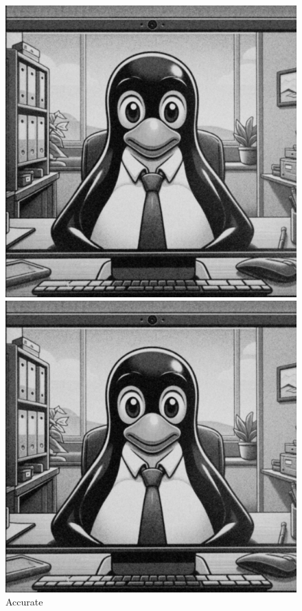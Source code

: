 \documentclass[course=erap]{aspdoc}
\begin{document}
\begin{figure}
    \centering
    \begin{minipage}[t]{.33\linewidth}
        \centering
        \includegraphics[width=\linewidth]{Image/Sample_VideoCall/denoisedvideocall_acurate.png}
        \caption{Accurate}
        \label{fig:accurate}
    \end{minipage}%
    \begin{minipage}[t]{.33\linewidth}
        \centering
        \includegraphics[width=\linewidth]{Image/Sample_VideoCall/denoisedvideocall_integer.png}

\end{minipage}
\end{figure}
\end{document}
